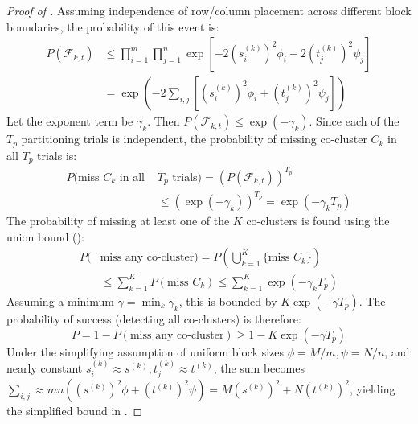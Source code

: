 \documentclass[journal]{IEEEtran}
\theoremstyle{definition}
\theoremstyle{remark} %
\begin{document}
\begin{proof}[Proof of ]
    Assuming independence of row/column placement across different block boundaries, the probability of this event is:
    \begin{equation}
        \begin{aligned}
            P(\mathcal{F}_{k,t}) & \le \prod_{i=1}^m \prod_{j=1}^n \exp\left[-2 (s_i^{(k)})^2 \phi_i -2 (t_j^{(k)})^2 \psi_j\right] \\
                                 & = \exp\left( -2 \sum_{i,j} \left[ (s_i^{(k)})^2 \phi_i + (t_j^{(k)})^2 \psi_j \right] \right)
        \end{aligned}
    \end{equation}
    Let the exponent term be $\gamma_k$. Then $P(\mathcal{F}_{k,t}) \le \exp(-\gamma_k)$. Since each of the $T_p$ partitioning trials is independent, the probability of missing co-cluster $C_k$ in all $T_p$ trials is:
    \begin{equation}
        \begin{aligned}
            P(\text{miss } C_k \text{ in all } & T_p \text{ trials}) = (P(\mathcal{F}_{k,t}))^{T_p} \\
                                               & \le (\exp(-\gamma_k))^{T_p} = \exp(-\gamma_k T_p)
        \end{aligned}
    \end{equation}
    The probability of missing at least one of the $K$ co-clusters is found using the union bound ():
    \begin{equation}
        \begin{aligned}
            P( & \text{miss any co-cluster}) = P\left(\bigcup_{k=1}^K \{\text{miss } C_k\}\right) \\
               & \le \sum_{k=1}^K P(\text{miss } C_k) \le \sum_{k=1}^K \exp(-\gamma_k T_p)
        \end{aligned}
    \end{equation}
    Assuming a minimum $\gamma = \min_k \gamma_k$, this is bounded by $K \exp(-\gamma T_p)$. The probability of success (detecting all co-clusters) is therefore:
    \begin{equation}
        P = 1 - P(\text{miss any co-cluster}) \ge 1 - K \exp(-\gamma T_p)
    \end{equation}
    Under the simplifying assumption of uniform block sizes $\phi=M/m, \psi=N/n$, and nearly constant $s_i^{(k)} \approx s^{(k)}, t_j^{(k)} \approx t^{(k)}$, the sum becomes $\sum_{i,j} \approx mn \left( (s^{(k)})^2 \phi + (t^{(k)})^2 \psi \right) = M (s^{(k)})^2 + N (t^{(k)})^2$, yielding the simplified bound in .
\end{proof}
\end{document}
